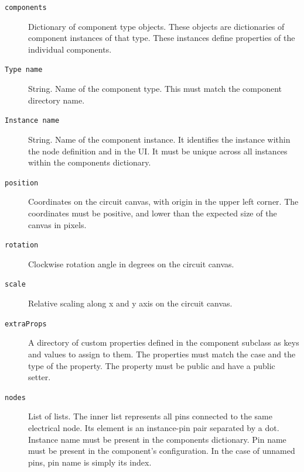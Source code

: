 \begin{description}
    \item[\texttt{components}]
    Dictionary of component type objects. These objects are dictionaries of component instances of that type. These instances define properties of the individual components. 

    \item[\texttt{Type name}]
    String. Name of the component type. This must match the component directory name.

    \item[\texttt{Instance name}]
    String. Name of the component instance. It identifies the instance within the node definition and in the UI. It must be unique across all instances within the components dictionary.

    \item[\texttt{position}]
    Coordinates on the circuit canvas, with origin in the upper left corner. The coordinates must be positive, and lower than the expected size of the canvas in pixels. \footnotemark

    \item[\texttt{rotation}]
    Clockwise rotation angle in degrees on the circuit canvas.

    \item[\texttt{scale}]
    Relative scaling along x and y axis on the circuit canvas.

    \item[\texttt{extraProps}]
    A directory of custom properties defined in the component subclass as keys and values to assign to them. The properties must match the case and the type of the property. The property must be public and have a public setter.

    \item[\texttt{nodes}]
    List of lists. The inner list represents all pins connected to the same electrical node. Its element is an instance-pin pair separated by a dot. Instance name must be present in the components dictionary. Pin name must be present in the component's configuration. In the case of unnamed pins, pin name is simply its index.
\end{description}




